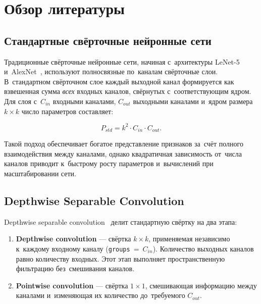 \section{Обзор литературы}

\subsection{Стандартные свёрточные нейронные сети}

Традиционные свёрточные нейронные сети, начиная с~архитектуры LeNet-5~\cite{lenet} и~AlexNet~\cite{alexnet}, используют полносвязные по~каналам свёрточные слои. В~стандартном свёрточном слое каждый выходной канал формируется как взвешенная сумма \textit{всех} входных каналов, свёрнутых с~соответствующим ядром. Для слоя с~$C_{in}$ входными каналами, $C_{out}$ выходными каналами и~ядром размера $k \times k$ число параметров составляет:

\begin{equation}
    P_{std} = k^2 \cdot C_{in} \cdot C_{out}.
    \label{eq:params_std}
\end{equation}

Такой подход обеспечивает богатое представление признаков за~счёт полного взаимодействия между каналами, однако квадратичная зависимость от~числа каналов приводит к~быстрому росту параметров и~вычислений при масштабировании сети.

\subsection{Depthwise Separable Convolution}

Depthwise separable convolution~\cite{mobilenet,xception} делит стандартную свёртку на два этапа:

\begin{enumerate}
    \item \textbf{Depthwise convolution} — свёртка $k \times k$, применяемая независимо к~каждому входному каналу (\texttt{groups}~=~$C_{in}$). Количество выходных каналов равно количеству входных. Этот этап выполняет пространственную фильтрацию без~смешивания каналов.
    \item \textbf{Pointwise convolution} — свёртка $1 \times 1$, смешивающая информацию между каналами и~изменяющая их количество до~требуемого $C_{out}$.
\end{enumerate}

